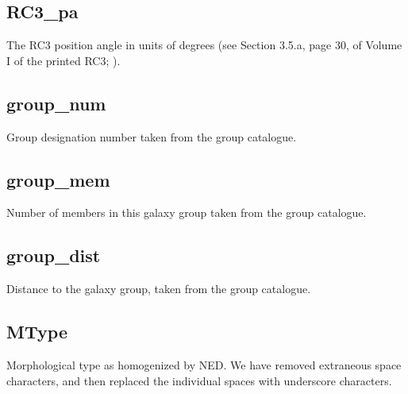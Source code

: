 \documentclass[twocolumn,tighten]{aastex62}
\begin{document}
\subsection{RC3\_pa} \label{RC3_pa}
The RC3 position angle in units of degrees (see Section 3.5.a, page 30, of Volume I of the printed RC3; \citealt{RC3}).

\subsection{group\_num} \label{group_num}
Group designation number taken from the \cite{tully2015} group catalogue.

\subsection{group\_mem} \label{group_mem}
Number of members in this galaxy group taken from the \cite{tully2015} group catalogue.

\subsection{group\_dist} \label{group_dist}
Distance to the galaxy group, taken from the \cite{tully2015} group catalogue.

\subsection{MType} \label{MType}
Morphological type as homogenized by NED. We have removed extraneous space characters, and then replaced the individual spaces with underscore characters.
\end{document}
